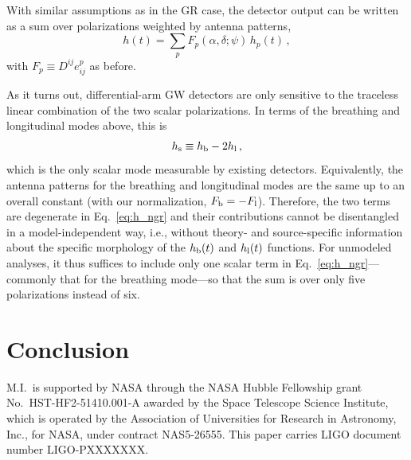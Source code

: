 \documentclass[aps,prd,twocolumn,superscriptaddress,preprintnumbers,floatfix,nofootinbib]{revtex4-2}
\newcommand{\beq}{\begin{equation}}
\newcommand{\eeq}{\end{equation}}
\newcommand{\dcc}{LIGO-PXXXXXXX}
\begin{document}
With similar assumptions as in the GR case, the detector output can be written as a sum over polarizations weighted by antenna patterns,
\beq \label{eq:h_ngr}
h(t) = \sum_p F_p(\alpha, \delta; \psi)\, h_p(t)\, ,
\eeq
with $F_p \equiv D^{ij} e^p_{ij}$ as before. 

As it turns out, differential-arm GW detectors are only sensitive to the traceless linear combination of the two scalar polarizations.
In terms of the breathing and longitudinal modes above, this is
\beq
h_{\rm s} \equiv \hb - 2\hlon\, ,
\eeq
which is the only scalar mode measurable by existing detectors.
Equivalently, the antenna patterns for the breathing and longitudinal modes are the same up to an overall constant (with our normalization, $F_{{\rm b}} = -F_{{\rm l}}$).
Therefore, the two terms are degenerate in Eq.~\eqref{eq:h_ngr} and their contributions cannot be disentangled in a model-independent way, i.e., without theory- and source-specific information about the specific morphology of the $h_{{\rm b}}(t)$ and $h_{{\rm l}}(t)$ functions.
For unmodeled analyses, it thus suffices to include only one scalar term in Eq.~\eqref{eq:h_ngr}---commonly that for the breathing mode---so that the sum is over only five polarizations instead of six.

\section{Conclusion}

\begin{acknowledgments}
M.I.\ is supported by NASA through the NASA Hubble Fellowship
grant No.\ HST-HF2-51410.001-A awarded by the Space Telescope
Science Institute, which is operated by the Association of Universities
for Research in Astronomy, Inc., for NASA, under contract NAS5-26555.
This paper carries LIGO document number \dcc{}.
\end{acknowledgments}

\end{document}

